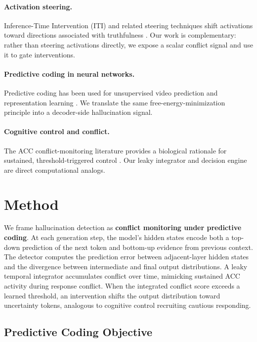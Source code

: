 \documentclass[letterpaper]{article}
\begin{document}
\paragraph{Activation steering.} Inference-Time Intervention (ITI) and related steering techniques shift activations toward directions associated with truthfulness \cite{li2023iti}. Our work is complementary: rather than steering activations directly, we expose a scalar conflict signal and use it to gate interventions.

\paragraph{Predictive coding in neural networks.} Predictive coding has been used for unsupervised video prediction and representation learning \cite{lotter2016deep, wen2020predictive}. We translate the same free-energy-minimization principle into a decoder-side hallucination signal.

\paragraph{Cognitive control and conflict.} The ACC conflict-monitoring literature provides a biological rationale for sustained, threshold-triggered control \cite{botvinick2001conflict, yeung2004neural, shenhav2013expected}. Our leaky integrator and decision engine are direct computational analogs.

\section{Method}

We frame hallucination detection as \textbf{conflict monitoring under predictive coding}. At each generation step, the model's hidden states encode both a top-down prediction of the next token and bottom-up evidence from previous context. The detector computes the prediction error between adjacent-layer hidden states and the divergence between intermediate and final output distributions. A leaky temporal integrator accumulates conflict over time, mimicking sustained ACC activity during response conflict. When the integrated conflict score exceeds a learned threshold, an intervention shifts the output distribution toward uncertainty tokens, analogous to cognitive control recruiting cautious responding.

\subsection{Predictive Coding Objective}
\end{document}

